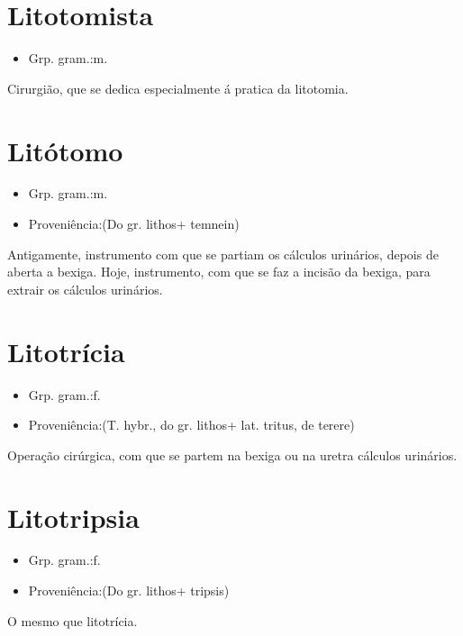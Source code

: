 \section{Litotomista}
\begin{itemize}
\item {Grp. gram.:m.}
\end{itemize}
Cirurgião, que se dedica especialmente á pratica da litotomia.
\section{Litótomo}
\begin{itemize}
\item {Grp. gram.:m.}
\end{itemize}
\begin{itemize}
\item {Proveniência:(Do gr. \textunderscore lithos\textunderscore  + \textunderscore temnein\textunderscore )}
\end{itemize}
Antigamente, instrumento com que se partiam os cálculos urinários, depois de aberta a bexiga.
Hoje, instrumento, com que se faz a incisão da bexiga, para extrair os cálculos urinários.
\section{Litotrícia}
\begin{itemize}
\item {Grp. gram.:f.}
\end{itemize}
\begin{itemize}
\item {Proveniência:(T. hybr., do gr. \textunderscore lithos\textunderscore  + lat. \textunderscore tritus\textunderscore , de \textunderscore terere\textunderscore )}
\end{itemize}
Operação cirúrgica, com que se partem na bexiga ou na uretra cálculos urinários.
\section{Litotripsia}
\begin{itemize}
\item {Grp. gram.:f.}
\end{itemize}
\begin{itemize}
\item {Proveniência:(Do gr. \textunderscore lithos\textunderscore  + \textunderscore tripsis\textunderscore )}
\end{itemize}
O mesmo que \textunderscore litotrícia\textunderscore .
